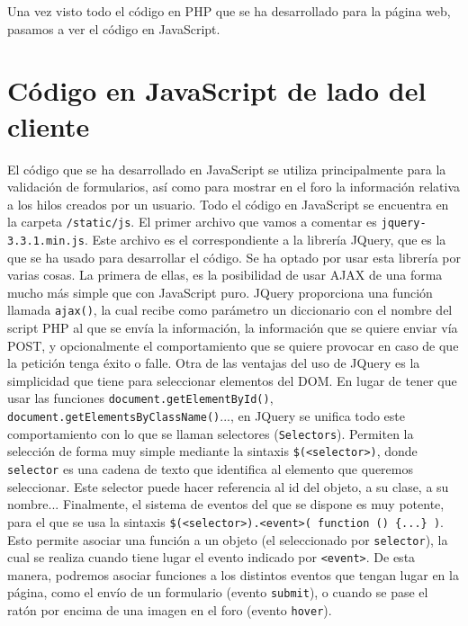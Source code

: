\documentclass[11pt]{article}
\theoremstyle{plain}
\theoremstyle{definition}
\begin{document}
Una vez visto todo el código en PHP que se ha desarrollado para la
página web, pasamos a ver el código en JavaScript.

\section{Código en JavaScript de lado del cliente}

El código que se ha desarrollado en JavaScript se utiliza
principalmente para la validación de formularios, así como para
mostrar en el foro la información relativa a los hilos creados por un
usuario. Todo el código en JavaScript se encuentra en la carpeta
\texttt{/static/js}. El primer archivo que vamos a comentar es
\texttt{jquery-3.3.1.min.js}. Este archivo es el correspondiente a la
librería JQuery, que es la que se ha usado para desarrollar el
código. Se ha optado por usar esta librería por varias cosas. La
primera de ellas, es la posibilidad de usar AJAX de una forma mucho
más simple que con JavaScript puro. JQuery proporciona una función
llamada \texttt{ajax()}, la cual recibe como parámetro un diccionario
con el nombre del script PHP al que se envía la información, la
información que se quiere enviar vía POST, y opcionalmente el
comportamiento que se quiere provocar en caso de que la petición tenga
éxito o falle. Otra de las ventajas del uso de JQuery es la
simplicidad que tiene para seleccionar elementos del DOM. En lugar de
tener que usar las funciones \texttt{document.getElementById()},
\texttt{document.getElementsByClassName()}..., en JQuery se unifica
todo este comportamiento con lo que se llaman selectores
(\texttt{Selectors}). Permiten la selección de forma muy simple
mediante la sintaxis \texttt{\$(<selector>)}, donde \texttt{selector}
es una cadena de texto que identifica al elemento que queremos
seleccionar.  Este selector puede hacer referencia al id del objeto, a
su clase, a su nombre... Finalmente, el sistema de eventos del que se
dispone es muy potente, para el que se usa la sintaxis
\texttt{\$(<selector>).<event>( function () \{...\} )}. Esto permite
asociar una función a un objeto (el seleccionado por
\texttt{selector}), la cual se realiza cuando tiene lugar el evento
indicado por \texttt{<event>}. De esta manera, podremos asociar
funciones a los distintos eventos que tengan lugar en la página, como
el envío de un formulario (evento \texttt{submit}), o cuando se pase
el ratón
por encima de una imagen en el foro (evento \texttt{hover}).\\
\end{document}
